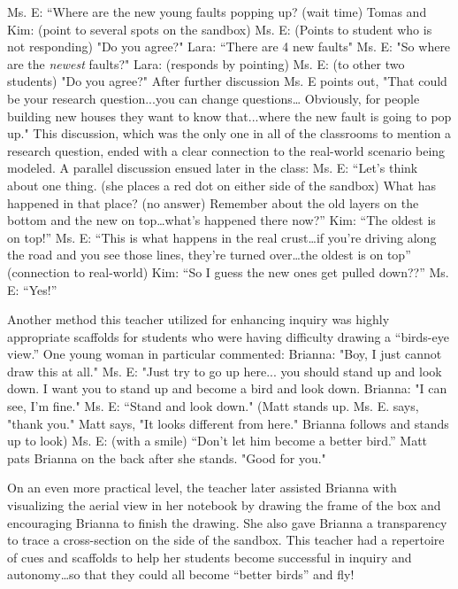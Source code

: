 \documentclass[11.5pt]{sig-alternate} %
\begin{document}
\begin{large}
Ms. E: “Where are the new young faults popping up? (wait time)
Tomas and Kim:  (point to several spots on the sandbox)  
Ms. E: (Points to student who is not responding) "Do you agree?" 
Lara: “There are 4 new faults"
Ms. E: "So where are the \textit{newest} faults?"  
Lara: (responds by pointing)
Ms. E: (to other two students) "Do you agree?"  
After further discussion Ms. E points out, "That could be your research question...you can change questions… Obviously, for people building new houses they want to know that...where the new fault is going to pop up." This discussion, which was the only one in all of the classrooms to mention a research question, ended with a clear connection to the real-world scenario being modeled.  A parallel discussion ensued later in the class:
Ms. E: “Let’s think about one thing. (she places a red dot on either side of the sandbox) What has happened in that place?  (no answer) Remember about the old layers on the bottom and the new on top…what’s happened there now?”
Kim: “The oldest is on top!”
Ms. E: “This is what happens in the real crust…if you’re driving along the road and you see those lines, they’re turned over…the oldest is on top” (connection to real-world)
Kim: “So I guess the new ones get pulled down??”
Ms. E: “Yes!”

Another method this teacher utilized for enhancing inquiry was highly appropriate scaffolds for students who were having difficulty drawing a “birds-eye view.”  One young woman in particular commented:
Brianna: "Boy, I just cannot draw this at all."  
Ms. E: "Just try to go up here... you should stand up and look down.  I want you to stand up and become a bird and look down.  
Brianna:  "I can see, I'm fine." 
Ms. E: “Stand and look down."  (Matt stands up.  Ms. E. says, "thank you." Matt says, "It looks different from here." Brianna follows and stands up to look)
Ms. E: (with a smile) “Don't let him become a better bird.”   Matt pats Brianna on the back after she stands. "Good for you."

On an even more practical level, the teacher later assisted Brianna with visualizing the aerial view in her notebook by drawing the frame of the box and encouraging Brianna to finish the drawing.  She also gave Brianna a transparency to trace a cross-section on the side of the sandbox.  This teacher had a repertoire of cues and scaffolds to help her students become successful in inquiry and autonomy…so that they could all become “better birds” and fly!


\end{large}
\end{document}

